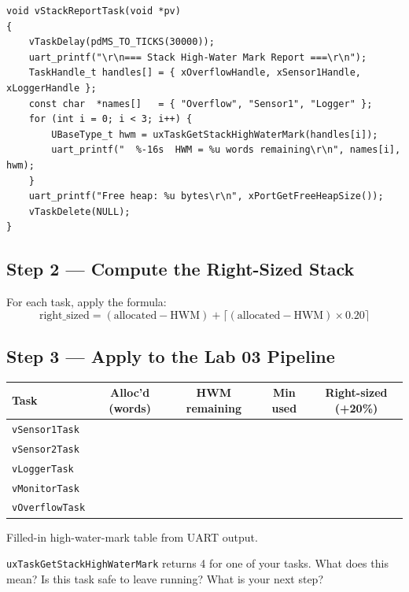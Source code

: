 \documentclass[11pt, a4paper]{article}
\begin{document}
\begin{lstlisting}[style=cstyle]
void vStackReportTask(void *pv)
{
    vTaskDelay(pdMS_TO_TICKS(30000));
    uart_printf("\r\n=== Stack High-Water Mark Report ===\r\n");
    TaskHandle_t handles[] = { xOverflowHandle, xSensor1Handle, xLoggerHandle };
    const char  *names[]   = { "Overflow", "Sensor1", "Logger" };
    for (int i = 0; i < 3; i++) {
        UBaseType_t hwm = uxTaskGetStackHighWaterMark(handles[i]);
        uart_printf("  %-16s  HWM = %u words remaining\r\n", names[i], hwm);
    }
    uart_printf("Free heap: %u bytes\r\n", xPortGetFreeHeapSize());
    vTaskDelete(NULL);
}
\end{lstlisting}

\subsection{Step 2 --- Compute the Right-Sized Stack}

For each task, apply the formula:
\[
  \text{right\_sized} = (\text{allocated} - \text{HWM}) + \lceil (\text{allocated} - \text{HWM}) \times 0.20 \rceil
\]

\subsection{Step 3 --- Apply to the Lab 03 Pipeline}

\renewcommand{\arraystretch}{1.3}
\begin{tabular}{@{} p{3.5cm} c c c c @{}}
  \toprule
  \textbf{Task} & \textbf{Alloc'd (words)} & \textbf{HWM remaining} &
    \textbf{Min used} & \textbf{Right-sized (+20\%)} \\
  \midrule
  \texttt{vSensor1Task}  & & & & \\
  \texttt{vSensor2Task}  & & & & \\
  \texttt{vLoggerTask}   & & & & \\
  \texttt{vMonitorTask}  & & & & \\
  \texttt{vOverflowTask} & & & & \\
  \bottomrule
\end{tabular}
\renewcommand{\arraystretch}{1}

\begin{checkpointbox}[~B]
  Filled-in high-water-mark table from UART output.
\end{checkpointbox}

\begin{questionbox}[~B1]
  \texttt{uxTaskGetStackHighWaterMark} returns 4 for one of your tasks. What does this
  mean? Is this task safe to leave running? What is your next step?
\end{questionbox}
\end{document}
